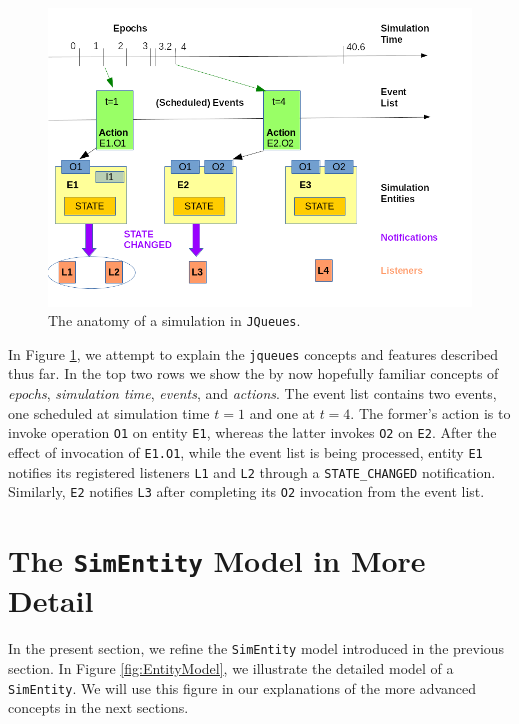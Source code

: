 \begin{figure}[h]
    \label{fig:AnatomyOfASimulationInJQueues}
    \caption{The anatomy of a simulation in \texttt{JQueues}.}
    \includegraphics[width=\textwidth]{fig/AnatomyOfASimulationInJQueues}
\end{figure}

In Figure \ref{fig:AnatomyOfASimulationInJQueues},
  we attempt to explain the \lstinline|jqueues|
  concepts and features described thus far.
In the top two rows we show the
  by now hopefully familiar concepts
  of {\em epochs},
  {\em simulation time},
  {\em events},
  and {\em actions}.
The event list contains two events,
  one scheduled at simulation time $t=1$
  and one at $t=4$.
The former's action is to invoke operation
  \lstinline|O1| on entity \lstinline|E1|,
  whereas the latter invokes \lstinline|O2|
  on \lstinline|E2|.
After the effect of invocation of \lstinline|E1.O1|,
  while the event list is being processed,
  entity \lstinline|E1| notifies
  its registered listeners
  \lstinline|L1| and \lstinline|L2|
  through a \lstinline|STATE_CHANGED| notification.
Similarly,
  \lstinline|E2| notifies \lstinline|L3|
  after completing its \lstinline|O2| invocation
  from the event list.
  
\section{The \texttt{\bf SimEntity} Model in More Detail}

In the present section,
  we refine the \lstinline|SimEntity| model
  introduced in the previous section.
In Figure \ref{fig:EntityModel},
  we illustrate the detailed model of a \lstinline|SimEntity|.
We will use this figure in our explanations
  of the more advanced concepts in the next sections.
  
